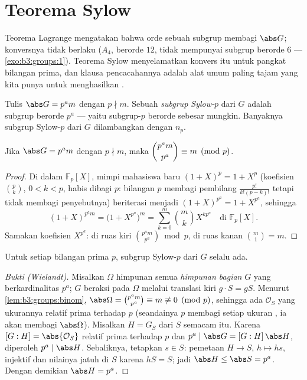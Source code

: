 \section{Teorema Sylow}

Teorema Lagrange mengatakan bahwa orde sebuah subgrup membagi $\abs G$;
konversnya tidak berlaku ($A_4$, berorde $12$, tidak mempunyai subgrup berorde
$6$ --- \cref{exo:b3:groups:1}). Teorema Sylow menyelamatkan
konvers itu untuk pangkat bilangan prima, dan klausa pencacahannya adalah
alat umum paling tajam yang kita punya untuk menghasilkan .

\begin{definition}\label{def:b3:groups:sylow}
Tulis $\abs G = p^a m$ dengan $p \nmid m$. Sebuah \emph{subgrup
Sylow-$p$} dari $G$ adalah subgrup berorde
$p^a$ --- yaitu subgrup-$p$ berorde sebesar mungkin. Banyaknya
subgrup Sylow-$p$ dari $G$ dilambangkan dengan $n_p$.
\end{definition}

\begin{lemma}\label{lem:b3:groups:binom}
Jika $\abs G = p^a m$ dengan $p \nmid m$, maka $\dbinom{p^a m}{p^a}
\equiv m \pmod p$.
\end{lemma}

\begin{proof}
Di dalam $\mathbb F_p[X]$, mimpi mahasiswa baru $(1+X)^p = 1 + X^p$ (koefisien
$\binom pk$, $0<k<p$, habis dibagi $p$: bilangan $p$
membagi pembilang $\frac{p!}{k!(p-k)!}$ tetapi tidak membagi
penyebutnya) beriterasi menjadi $(1+X)^{p^a} = 1 + X^{p^a}$, sehingga
\[
(1+X)^{p^a m} = \bigl(1 + X^{p^a}\bigr)^m
= \sum_{k=0}^{m} \binom mk X^{k p^a} \quad\text{di } \mathbb
F_p[X].
\]
Samakan koefisien $X^{p^a}$: di ruas kiri $\binom{p^a
m}{p^a} \bmod p$, di ruas kanan $\binom m1 = m$.
\end{proof}

\begin{theorem}\label{thm:b3:groups:sylow1}
Untuk setiap bilangan prima $p$, subgrup Sylow-$p$ dari $G$ selalu ada.
\end{theorem}

\begin{proof}[Bukti (Wielandt)]
Misalkan $\Omega$ himpunan semua \emph{himpunan bagian} $G$ yang berkardinalitas
$p^a$; $G$ beraksi pada $\Omega$ melalui translasi kiri $g \cdot S = gS$.
Menurut \cref{lem:b3:groups:binom}, $\abs\Omega = \binom{p^a m}{p^a}
\equiv m \not\equiv 0 \pmod p$, sehingga ada  $\mathcal O_S$ yang
ukurannya relatif prima terhadap $p$ (seandainya $p$ membagi setiap ukuran , ia akan membagi
$\abs\Omega$). Misalkan $H = G_S$  dari $S$ semacam itu.
Karena $[G : H] = \abs{\mathcal O_S}$ relatif prima terhadap $p$ dan $p^a \mid
\abs G = [G:H]\,\abs H$, diperoleh $p^a \mid \abs H$. Sebaliknya, tetapkan
$s \in S$: pemetaan $H \to S$, $h \mapsto hs$, injektif dan
nilainya jatuh di $S$ karena $hS = S$; jadi $\abs H \leq \abs S = p^a$.
Dengan demikian $\abs H = p^a$.
\end{proof}

